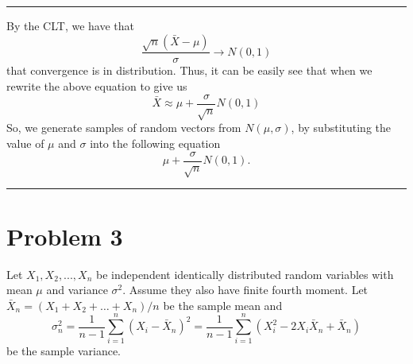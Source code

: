 \documentclass{article} %
\begin{document}
\begin{enumerate}
\rule{\textwidth}{1pt}
By the CLT, we have that 
\[  \frac{\sqrt{n}(\bar{X}-\mu)}{\sigma} \to N(0,1)  \]
that convergence is in distribution. Thus, it can be easily see that when we rewrite the above equation to give us
\[  \bar{X} \approx  \mu + \frac{\sigma}{\sqrt{n}}N(0,1)\]
So, we generate samples of random vectors from $N(\mu,\sigma)$, by substituting the value of $\mu$ and $\sigma$ into the following equation 
\[\mu + \frac{\sigma}{\sqrt{n}}N(0,1).\]

\rule{\textwidth}{1pt}
\end{enumerate}



\section*{Problem 3}
Let $X_1, X_2,... , X_n$ be independent identically distributed random variables with mean $\mu$ and variance $\sigma^2$. Assume they also have finite fourth moment. Let $\bar{X}_n = (X_1 + X_2 + \dotsc+ X_n)/n$ be the sample mean and
\[  \sigma^2_n = \frac{1}{n-1}\sum_{i=1}^n (X_i-\bar{X}_n)^2 = \frac{1}{n-1}\sum_{i=1}^n (X_i^2- 2X_i \bar{X}_n + \bar{X}_n) \]
be the sample variance.
\end{document}
